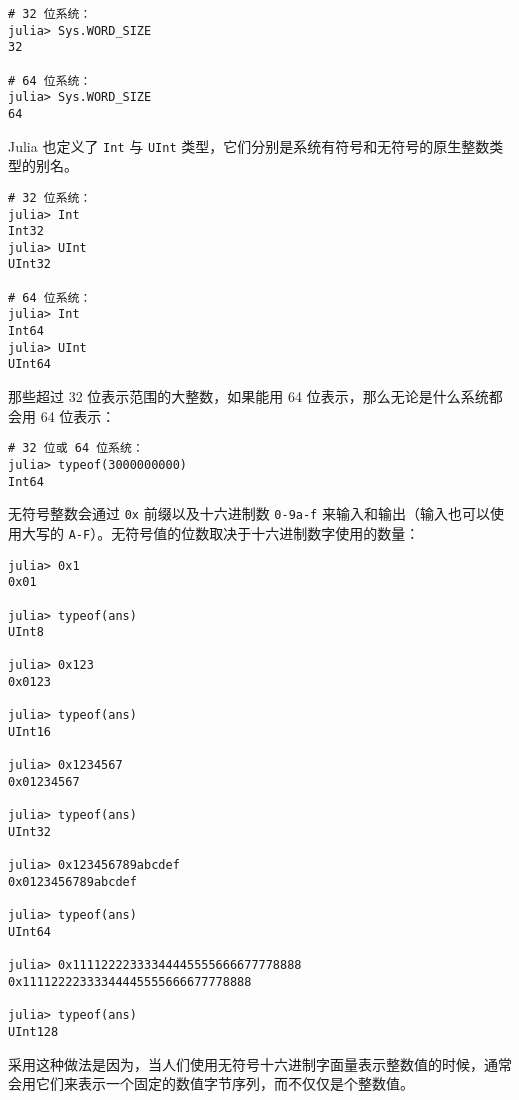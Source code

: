 \begin{verbatim}
# 32 位系统：
julia> Sys.WORD_SIZE
32

# 64 位系统：
julia> Sys.WORD_SIZE
64
\end{verbatim}



Julia 也定义了 \texttt{Int} 与 \texttt{UInt} 类型，它们分别是系统有符号和无符号的原生整数类型的别名。




\begin{verbatim}
# 32 位系统：
julia> Int
Int32
julia> UInt
UInt32

# 64 位系统：
julia> Int
Int64
julia> UInt
UInt64
\end{verbatim}



那些超过 32 位表示范围的大整数，如果能用 64 位表示，那么无论是什么系统都会用 64 位表示：




\begin{verbatim}
# 32 位或 64 位系统：
julia> typeof(3000000000)
Int64
\end{verbatim}



无符号整数会通过 \texttt{0x} 前缀以及十六进制数 \texttt{0-9a-f} 来输入和输出（输入也可以使用大写的 \texttt{A-F}）。无符号值的位数取决于十六进制数字使用的数量：




\begin{verbatim}
julia> 0x1
0x01

julia> typeof(ans)
UInt8

julia> 0x123
0x0123

julia> typeof(ans)
UInt16

julia> 0x1234567
0x01234567

julia> typeof(ans)
UInt32

julia> 0x123456789abcdef
0x0123456789abcdef

julia> typeof(ans)
UInt64

julia> 0x11112222333344445555666677778888
0x11112222333344445555666677778888

julia> typeof(ans)
UInt128
\end{verbatim}



采用这种做法是因为，当人们使用无符号十六进制字面量表示整数值的时候，通常会用它们来表示一个固定的数值字节序列，而不仅仅是个整数值。



